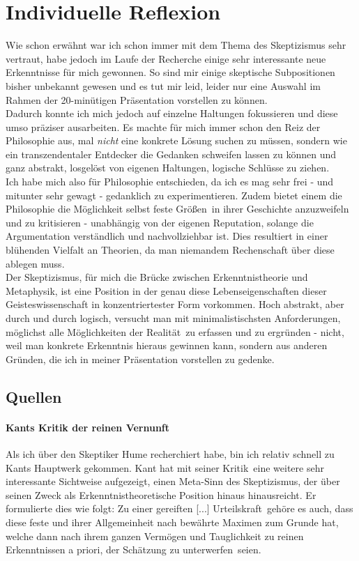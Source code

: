 \documentclass[12pt,a4paper,final]{article}
\begin{document}
\section*{Individuelle Reflexion}
Wie schon erwähnt war ich schon immer mit dem Thema des Skeptizismus sehr vertraut, habe jedoch im Laufe der Recherche einige sehr interessante neue Erkenntnisse für mich gewonnen. So sind mir einige skeptische Subpositionen bisher unbekannt gewesen und es tut mir leid, leider nur eine Auswahl im Rahmen der 20-minütigen Präsentation vorstellen zu können.\\
Dadurch konnte ich mich jedoch auf einzelne Haltungen fokussieren und diese umso präziser ausarbeiten. Es machte für mich immer schon den Reiz der Philosophie aus, mal \emph{nicht} eine konkrete Lösung suchen zu müssen, sondern wie ein transzendentaler Entdecker die Gedanken schweifen lassen zu können und ganz abstrakt, losgelöst von eigenen Haltungen, logische Schlüsse zu ziehen.\\

Ich habe mich also für Philosophie entschieden, da ich es mag sehr frei - und mitunter sehr gewagt - gedanklich zu experimentieren. Zudem bietet einem die Philosophie die Möglichkeit selbst feste \glqq Größen\grqq\ in ihrer Geschichte anzuzweifeln und zu kritisieren - unabhängig von der eigenen Reputation, solange die Argumentation verständlich und nachvollziehbar ist. Dies resultiert in einer blühenden Vielfalt an Theorien, da man niemandem Rechenschaft über diese ablegen muss.\\
Der Skeptizismus, für mich die Brücke zwischen Erkenntnistheorie und Metaphysik, ist eine Position in der genau diese Lebenseigenschaften dieser Geisteswissenschaft in konzentriertester Form vorkommen. Hoch abstrakt, aber durch und durch logisch, versucht man mit minimalistischsten Anforderungen, möglichst alle Möglichkeiten der \glqq Realität\grqq\ zu erfassen und zu ergründen - nicht, weil man konkrete Erkenntnis hieraus gewinnen kann, sondern aus anderen Gründen, die ich in meiner Präsentation vorstellen zu gedenke.
\subsection*{Quellen}
\paragraph{Kants \glqq Kritik der reinen Vernunft\grqq\ \cite{ik_kritik}} Als ich über den Skeptiker Hume recherchiert habe, bin ich relativ schnell zu Kants Hauptwerk gekommen. Kant hat mit seiner \glqq Kritik\grqq\ eine weitere sehr interessante Sichtweise aufgezeigt, einen Meta-Sinn des Skeptizismus, der über seinen Zweck als Erkenntnistheoretische Position hinaus hinausreicht. Er formulierte dies wie folgt: Zu einer \glqq gereiften [...] Urteilskraft\grqq\ gehöre es auch, dass diese \glqq feste und ihrer Allgemeinheit nach bewährte Maximen zum Grunde hat\grqq, welche dann \glqq nach ihrem ganzen Vermögen und Tauglichkeit zu reinen Erkenntnissen a priori, der Schätzung zu unterwerfen\grqq\ seien.
\end{document}
